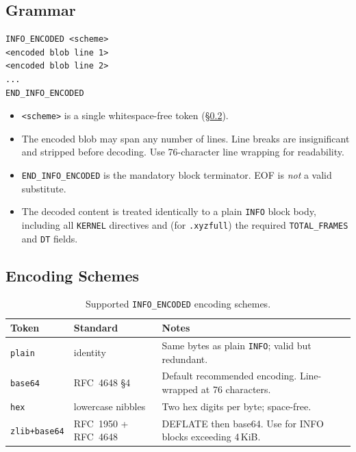 \documentclass[12pt, a4paper, oneside]{article}
\begin{document}
\subsection{Grammar}

\begin{lstlisting}[language={},frame=single]
INFO_ENCODED <scheme>
<encoded blob line 1>
<encoded blob line 2>
...
END_INFO_ENCODED
\end{lstlisting}

\begin{itemize}
  \item \texttt{<scheme>} is a single whitespace-free token
        (\S\ref{sec:encoding_schemes}).
  \item The encoded blob may span any number of lines.  Line breaks are
        insignificant and stripped before decoding.  Use 76-character
        line wrapping for readability.
  \item \texttt{END\_INFO\_ENCODED} is the mandatory block terminator.
        EOF is \emph{not} a valid substitute.
  \item The decoded content is treated identically to a plain
        \texttt{INFO} block body, including all \texttt{KERNEL} directives
        and (for \texttt{.xyzfull}) the required \texttt{TOTAL\_FRAMES}
        and \texttt{DT} fields.
\end{itemize}

\subsection{Encoding Schemes}
\label{sec:encoding_schemes}

\begin{table}[htbp]
  \centering
  \caption{Supported \texttt{INFO\_ENCODED} encoding schemes.}
  \label{tab:enc_schemes}
  \begin{tabular}{llp{6cm}}
    \toprule
    Token & Standard & Notes \\
    \midrule
    \texttt{plain}       & identity          & Same bytes as plain \texttt{INFO};
                                               valid but redundant. \\
    \texttt{base64}      & RFC~4648 \S{}4    & Default recommended encoding.
                                               Line-wrapped at 76 characters. \\
    \texttt{hex}         & lowercase nibbles & Two hex digits per byte; space-free. \\
    \texttt{zlib+base64} & RFC~1950 + RFC~4648 & DEFLATE then base64.
                                               Use for INFO blocks exceeding 4\,KiB. \\
    \bottomrule
  \end{tabular}
\end{table}
\end{document}
